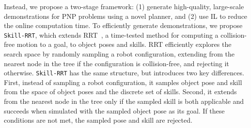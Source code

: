 Instead, we propose a two-stage framework: (1) generate high-quality, large-scale demonstrations for PNP problems using a novel planner, and (2) use IL to reduce the online computation time. To efficiently generate demonstrations, we propose \texttt{Skill-RRT}, which extends RRT~\cite{lavalle1998rapidly}, a time-tested method for computing a collision-free motion to a goal, to object poses and skills. RRT efficiently explores the search space by randomly sampling a robot configuration, extending from the nearest node in the tree if the configuration is collision-free, and rejecting it otherwise. \texttt{Skill-RRT} has the same structure, but introduces two key differences. First, instead of sampling a robot configuration, it samples object pose and skill from the space of object poses and the discrete set of skills. Second, it extends from the nearest node in the tree only if the sampled skill is both applicable and succeeds when simulated with the sampled object pose as its goal. If these conditions are not met, the sampled pose and skill are rejected.

\newcommand{\skillrrt}{\texttt{Skill-RRT}}
\newcommand{\lazyskillrrt}{\texttt{Lazy Skill-RRT}}


